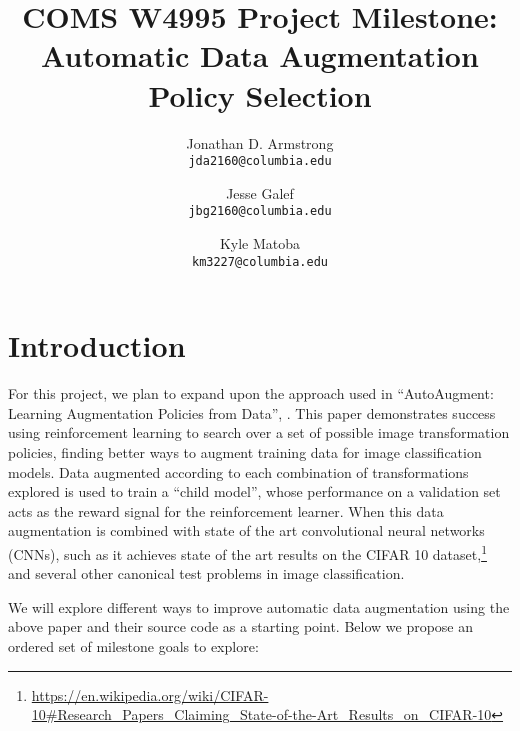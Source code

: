 \documentclass[10pt,twocolumn,letterpaper]{article}
\begin{document}
\title{COMS W4995 Project Milestone: Automatic Data Augmentation Policy Selection}

\author{Jonathan D. Armstrong\\
{\tt\small jda2160@columbia.edu}
\and
Jesse Galef\\
{\tt\small jbg2160@columbia.edu}
\and
Kyle Matoba\\
{\tt\small km3227@columbia.edu}
}

\maketitle


 
\section{Introduction}

	For this project, we plan to expand upon the approach used in ``AutoAugment: Learning Augmentation Policies from Data'', \cite{Cubuk2018}. This paper demonstrates success using reinforcement learning to search over a set of possible image transformation policies, finding better ways to augment training data for image classification models. Data augmented according to each combination of transformations explored is used to train a ``child model'', whose performance on a validation set acts as the reward signal for the reinforcement learner. When this data augmentation is combined with state of the art convolutional neural networks (CNNs), such as \cite{Yamada2018} it achieves state of the art results on the CIFAR 10 dataset,\footnote{\url{https://en.wikipedia.org/wiki/CIFAR-10\#Research\_Papers\_Claiming\_State-of-the-Art\_Results\_on\_CIFAR-10}} and several other canonical test problems in image classification. 
	
	We will explore different ways to improve automatic data augmentation using the above paper and their source code as a starting point. Below we propose an ordered set of milestone goals to explore:
	
\end{document}
